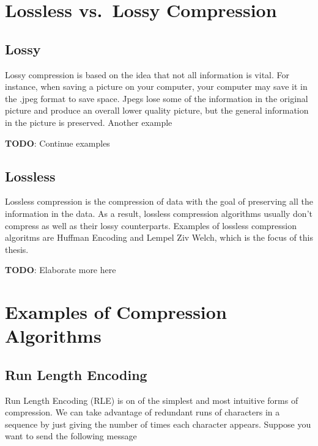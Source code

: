 \documentclass[12pt,twoside]{reedthesis}
\begin{document}
\hypertarget{lossless-vs.-lossy-compression}{%
\section{Lossless vs.~Lossy Compression}\label{lossless-vs.-lossy-compression}}

\hypertarget{lossy}{%
\subsection{Lossy}\label{lossy}}

Lossy compression is based on the idea that not all information is vital. For instance, when saving a picture on your computer, your computer may save it in the .jpeg format to save space. Jpegs lose some of the information in the original picture and produce an overall lower quality picture, but the general information in the picture is preserved. Another example

\textbf{TODO}: Continue examples

\hypertarget{lossless}{%
\subsection{Lossless}\label{lossless}}

Lossless compression is the compression of data with the goal of preserving all the information in the data. As a result, lossless compression algorithms usually don't compress as well as their lossy counterparts. Examples of lossless compression algoritms are Huffman Encoding and Lempel Ziv Welch, which is the focus of this thesis.

\textbf{TODO}: Elaborate more here

\hypertarget{examples-of-compression-algorithms}{%
\section{Examples of Compression Algorithms}\label{examples-of-compression-algorithms}}

\hypertarget{run-length-encoding}{%
\subsection{Run Length Encoding}\label{run-length-encoding}}

Run Length Encoding (RLE) is on of the simplest and most intuitive forms of compression. We can take advantage of redundant runs of characters in a sequence by just giving the number of times each character appears.
Suppose you want to send the following message
\end{document}
